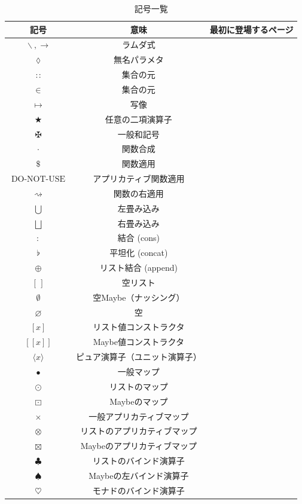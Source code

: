 \documentclass[a4paper]{jsbook}
\def\[{\left[\!\left[}
\def\]{\right]\!\right]}
\newcommand{\mListWith}[1]{\left[#1\right]}
\newcommand{\mMaybeWith}[1]{\[#1\]}
\newcommand{\mUnitWith}[1]{\langle\!\langle#1\rangle\!\rangle}
\newcommand{\mPureWith}[1]{\langle#1\rangle}
\newcommand{\mEmptyList}{{[\,]}}
\newcommand{\mNothing}{\emptyset}
\newcommand{\mPureNothing}{\varnothing}
\newcommand{\mAnonParameter}{\lozenge}
\DeclareMathOperator{\mLambda}{\backslash}
\DeclareMathOperator{\mLambdaArrow}{\rightarrow}
\DeclareMathOperator{\mIn}{{:\!:}}
\DeclareMathOperator{\mMapsTo}{\mapsto}
\DeclareMathOperator{\mBinOp}{\bigstar}
\DeclareMathOperator{\mPlus}{\maltese}
\DeclareMathOperator{\mComp}{\cdot}
\DeclareMathOperator{\mApply}{\$}
\DeclareMathOperator{\mApplyRight}{\rightsquigarrow}
\DeclareMathOperator*{\mFold}{\bigcup}
\DeclareMathOperator*{\mFoldRight}{\bigsqcup}
\DeclareMathOperator{\mCons}{:}
\DeclareMathOperator{\mConcat}{\flat}
\DeclareMathOperator{\mAppend}{\oplus}
\DeclareMathOperator{\mMap}{\bullet}
\DeclareMathOperator{\mMapList}{\odot}
\DeclareMathOperator{\mMapMaybe}{\boxdot}
\DeclareMathOperator{\mAMap}{\times}
\DeclareMathOperator{\mAMapList}{\otimes}
\DeclareMathOperator{\mAMapMaybe}{\boxtimes}
\DeclareMathOperator{\mApplicativeApply}{\text{DO-NOT-USE}}
\DeclareMathOperator{\mBindList}{\clubsuit}%
\DeclareMathOperator{\mBindMaybe}{\spadesuit}%
\DeclareMathOperator{\mBind}{\heartsuit}%
\newcommand{\mathMaybeAppend}{\mathbin{\boxplus}}
\begin{document}
\begin{table}[p]
\caption{記号一覧}
\begin{center}
\begin{tabular}{||c|c|c||}
\hline
記号&意味&最初に登場するページ\\
\hline\hline
$\mLambda, \mLambdaArrow$&ラムダ式&\\
$\mAnonParameter$&無名パラメタ&\\
\hline
$\mIn$&集合の元&\\
$\in$&集合の元&\\
$\mMapsTo$&写像&\\\hline
$\mBinOp$&任意の二項演算子&\\
$\mPlus$&一般和記号&\\
$\mComp$&関数合成&\\
$\mApply$&関数適用&\\
$\mApplicativeApply$&アプリカティブ関数適用&\\
$\mApplyRight$&関数の右適用&\\\hline
$\mFold$&左畳み込み&\\
$\mFoldRight$&右畳み込み&\\
\hline
$\mCons$&結合 (cons)&\\
$\mConcat$&平坦化 (concat)&\\
$\mAppend$&リスト結合 (append)&\\
\hline
$\mEmptyList$&空リスト&\\
$\mNothing$&空Maybe（ナッシング）&\\
$\mPureNothing$&空&\\\hline
$\mListWith{x}$&リスト値コンストラクタ&\\
$\mMaybeWith{x}$&Maybe値コンストラクタ&\\
$\mPureWith{x}$&ピュア演算子（ユニット演算子）&\\
\hline
$\mMap$&一般マップ&\\
$\mMapList$&リストのマップ&\\
$\mMapMaybe$&Maybeのマップ&\\
\hline
$\mAMap$&一般アプリカティブマップ&\\
$\mAMapList$&リストのアプリカティブマップ&\\
$\mAMapMaybe$&Maybeのアプリカティブマップ&\\
\hline
$\mBindList$&リストのバインド演算子&\\
$\mBindMaybe$&Maybeの左バインド演算子&\\
$\mBind$&モナドのバインド演算子&\\
\hline
\end{tabular}
\end{center}
\end{table}
\end{document}
